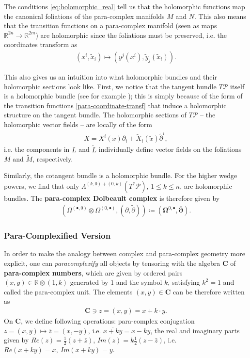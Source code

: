 \documentclass{article}
\newcommand{\RR}{\mathbb{R}}
\newcommand{\PS}{\mathcal{P}}
\newcommand{\p}{\partial}
\newcommand{\pt}{\tilde{\partial}}
\newcommand{\xt}{{\tilde{x}}}
\newcommand{\Lt}{\tl{L}}
\newcommand{\yt}{\tl{y}}
\newcommand{\Mt}{\tl{M}}
\newcommand{\pd}{\overline{\bm{\p}}}
\def\tl{\tilde}
\theoremstyle{definition}
\theoremstyle{remark}
\begin{document}
The conditions \eqref{eq:holomorphic_real} tell us that the holomorphic functions map the canonical foliations of the para-complex manifolds $M$ and $N$. This also means that the transition functions on a para-complex manifold (seen as maps $\RR^{2n}\rightarrow \RR^{2m}$) are holomorphic since the foliations must be preserved, i.e. the coordinates transform as
\begin{align}\label{para-coordinate-transf}
(x^i,\xt_i)\mapsto (y^j(x^i),\yt_j(\xt_i)).
\end{align}

This also gives us an intuition into what holomorphic bundles and their holomorphic sections look like. First, we notice that the tangent bundle $T\PS$ itself is a holomorphic bundle (see for example \cite{Cortes:2003zd,Hu:2019zro}); this is simply because of the form of the transition functions \eqref{para-coordinate-transf} that induce a holomorphic structure on the tangent bundle. The holomorphic sections of $T\PS$ -- the holomorphic vector fields -- are locally of the form
\begin{align*}
X= X^i(x)\p_i+\tl{X}_i(\xt)\pt^i,
\end{align*}
i.e. the components in $L$ and $\Lt$ individually define vector fields on the foliations $M$ and $\Mt$, respectively.  

Similarly, the cotangent bundle is a holomorphic bundle. For the higher wedge powers, we find that only $\Lambda^{(k,0)+(0,k)}(T^*\PS)$, $1\leq k\leq n$, are holomorphic bundles. The {\bf para-complex Dolbeault complex} is therefore given by
\begin{align}\label{para-dolbeault}
\left(\Omega^{(\bullet,0)}\otimes\Omega^{(0,\bullet)},(\p,\pt)\right)\coloneqq \left(\mathbf{\Omega}^{0,\bullet},\pd\right).
\end{align}

\subsubsection{Para-Complexified Version}
In order to make the analogy between complex and para-complex geometry more explicit, one can \textit{paracomplexify} all objects by tensoring with the algebra $\mathbf{C}$ of \textbf{para-complex numbers}, which are given by ordered pairs $(x,y)\in \mathbb{R}\otimes (1,k)$ generated by $1$ and the symbol $k$, satisfying $k^2=1$ and called the para-complex unit. The elements $(x,y)\in \mathbf{C}$ can be therefore written as
\begin{align*}
\mathbf{C} \ni z=(x,y)=x+k\cdot y.
\end{align*}
On $\mathbf{C}$, we define following operations: para-complex conjugation $z=(x,y)\mapsto \bar{z}=(x,-y)$, i.e. $\overline{x+ky}=x-ky$, the real and imaginary parts given by $Re(z)=\frac{1}{2}(z+\bar{z})$, $Im(z)=k\frac{1}{2}(z-\bar{z})$, i.e. $Re(x+ky)=x,\ Im(x+ky)=y$.
\end{document}
